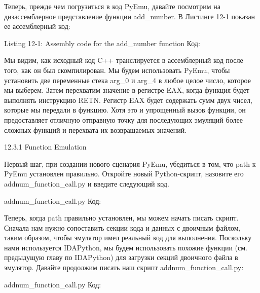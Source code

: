 \documentclass[12pt, a4paper, oneside]{book}
\begin{document}
Теперь, прежде чем погрузиться в код PyEmu, давайте посмотрим на дизассемблерное представление функции add\_number. В Листинге 12-1 показан ее ассемблерный код:

Listing 12-1: Assembly code for the add\_number function
Код:

Мы видим, как исходный код C++ транслируется в ассемблерный код после того, как он был скомпилирован. Мы будем использовать PyEmu, чтобы установить две переменные стека arg\_0 и arg\_4 в любое целое число, которое мы выберем. Затем перехватим значение в регистре EAX, когда функция будет выполнять инструкцию RETN. Регистр EAX будет содержать сумм двух чисел, которые мы передали в функцию. Хотя это и упрощенный вызов функции, он предоставляет отличную отправную точку для последующих эмуляций более сложных функций и перехвата их возвращаемых значений.

12.3.1 Function Emulation

Первый шаг, при создании нового сценария PyEmu, убедиться в том, что path к PyEmu установлен правильно. Откройте новый Python-скрипт, назовите его addnum\_function\_call.py и введите следующий код.

addnum\_function\_call.py
Код:

Теперь, когда path правильно установлен, мы можем начать писать скрипт. Сначала нам нужно сопоставить секции кода и данных с двоичным файлом, таким образом, чтобы эмулятор имел реальный код для выполнения. Поскольку нами используется IDAPython, мы будем использовать похожие функции (см. предыдущую главу по IDAPython) для загрузки секций двоичного файла в эмулятор. Давайте продолжим писать наш скрипт addnum\_function\_call.py:

addnum\_function\_call.py
Код:


\end{document}
